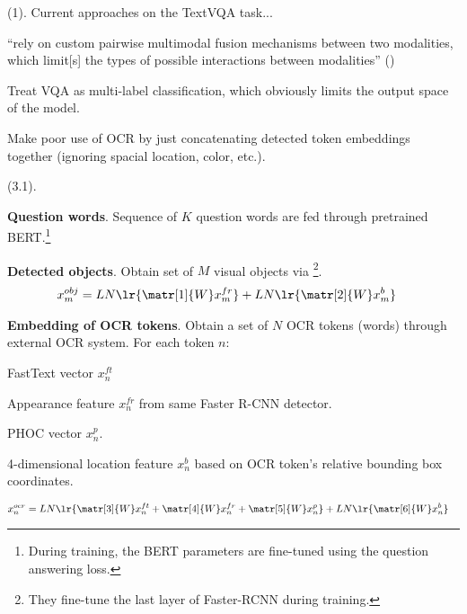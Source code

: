 \documentclass[11pt]{article}
\begin{document}
 (1). Current approaches on the TextVQA task...
\begin{compactitem}
	\item ``rely on custom pairwise multimodal fusion mechanisms between two modalities, which limit[s] the types of possible interactions between modalities'' ()
	
	\item Treat VQA as multi-label classification, which obviously limits the output space of the model.
	
	\item Make poor use of OCR by just concatenating detected token embeddings together (ignoring spacial location, color, etc.).
\end{compactitem}



 (3.1).  

\begin{compactitem}
	\item \textbf{Question words}. Sequence of $K$ question words are fed through pretrained BERT.\footnote{During training, the BERT parameters are fine-tuned using the question answering loss.}
	
	\item \textbf{Detected objects}. Obtain set of $M$ visual objects via \footnote{They fine-tune the last layer of Faster-RCNN during training.}.
	\begin{align}
		x_m^{obj}
			&= LN \lr{ \matr[1]{W} x_m^{fr} } + LN\lr{ \matr[2]{W} x_m^b }
	\end{align}
	
	\item \textbf{Embedding of OCR tokens}. Obtain a set of $N$ OCR tokens (words) through external OCR system. For each token $n$:
	\begin{compactenum}
		\item FastText vector $x_n^{ft}$
		\item Appearance feature $x_n^{fr}$ from same Faster R-CNN detector.
		\item PHOC vector $x_n^{p}$. 
		\item 4-dimensional location feature $x_n^b$ based on OCR token's relative bounding box coordinates.
	\end{compactenum}
	\begin{align}
		x_n^{ocr}
			&= LN\lr{ \matr[3]{W} x_n^{ft} + \matr[4]{W} x_n^{fr} + \matr[5]{W} x_n^{p} } + LN\lr{  \matr[6]{W} x_n^{b} }
	\end{align}
\end{compactitem}
\end{document}
